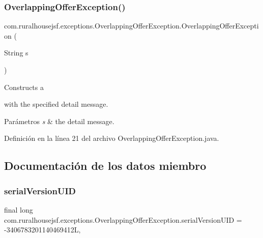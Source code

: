 \subsubsection{\texorpdfstring{OverlappingOfferException()}{OverlappingOfferException()}\hspace{0.1cm}{\footnotesize\ttfamily [2/2]}}
{\footnotesize\ttfamily com.\+ruralhousejsf.\+exceptions.\+Overlapping\+Offer\+Exception.\+Overlapping\+Offer\+Exception (\begin{DoxyParamCaption}\item[{String}]{s }\end{DoxyParamCaption})}

Constructs a
\begin{DoxyCode}{0}
\end{DoxyCode}
 with the specified detail message.


\begin{DoxyParams}{Parámetros}
{\em s} & the detail message. \\
\hline
\end{DoxyParams}


Definición en la línea 21 del archivo Overlapping\+Offer\+Exception.\+java.



\subsection{Documentación de los datos miembro}
\mbox{\label{classcom_1_1ruralhousejsf_1_1exceptions_1_1_overlapping_offer_exception_aaff379d27ee36188b92cd4ed2ee2010e}} 
\subsubsection{\texorpdfstring{serialVersionUID}{serialVersionUID}}
{\footnotesize\ttfamily final long com.\+ruralhousejsf.\+exceptions.\+Overlapping\+Offer\+Exception.\+serial\+Version\+U\+ID = -\/3406783201140469412L\hspace{0.3cm}{\ttfamily [static]}, {\ttfamily [private]}}



